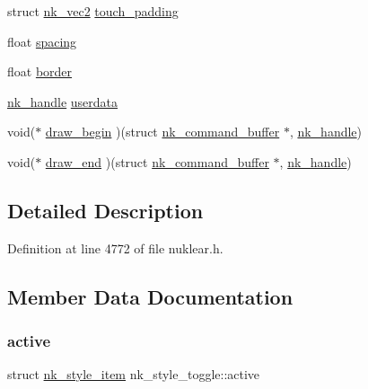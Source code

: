 \begin{DoxyCompactItemize}
\item 
struct \mbox{\hyperlink{structnk__vec2}{nk\+\_\+vec2}} \mbox{\hyperlink{structnk__style__toggle_a5734e9bce0fee5178808a98fd6eb5ce2}{touch\+\_\+padding}}
\item 
float \mbox{\hyperlink{structnk__style__toggle_af368c4c5cf5c3b1daf96ec50fb945275}{spacing}}
\item 
float \mbox{\hyperlink{structnk__style__toggle_a820feec522239e6415f2b177fa8feeda}{border}}
\item 
\mbox{\hyperlink{unionnk__handle}{nk\+\_\+handle}} \mbox{\hyperlink{structnk__style__toggle_ac3df28dd0fd8945d9d4effbd0953c957}{userdata}}
\item 
void($\ast$ \mbox{\hyperlink{structnk__style__toggle_aabff3e571b5bfd25c2b6d2d10a90c218}{draw\+\_\+begin}} )(struct \mbox{\hyperlink{structnk__command__buffer}{nk\+\_\+command\+\_\+buffer}} $\ast$, \mbox{\hyperlink{unionnk__handle}{nk\+\_\+handle}})
\item 
void($\ast$ \mbox{\hyperlink{structnk__style__toggle_a499f50c32b35717f5022272b95764599}{draw\+\_\+end}} )(struct \mbox{\hyperlink{structnk__command__buffer}{nk\+\_\+command\+\_\+buffer}} $\ast$, \mbox{\hyperlink{unionnk__handle}{nk\+\_\+handle}})
\end{DoxyCompactItemize}


\subsection{Detailed Description}


Definition at line 4772 of file nuklear.\+h.



\subsection{Member Data Documentation}
\mbox{\label{structnk__style__toggle_a530dd1ded7867e555198fe08b666146f}} 
\subsubsection{\texorpdfstring{active}{active}}
{\footnotesize\ttfamily struct \mbox{\hyperlink{structnk__style__item}{nk\+\_\+style\+\_\+item}} nk\+\_\+style\+\_\+toggle\+::active}



